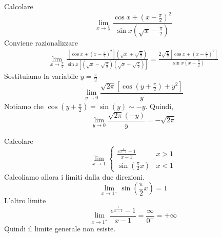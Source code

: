 \documentclass[a4paper]{article}
\begin{document}
\begin{snippetexercise}{}
    Calcolare
    \[
        \lim_{x\to \frac{\pi}{2}}
        \frac{
            \cos x + {\left(x-\frac{\pi}{2}\right)}^2
        }{
            \sin x \left(\sqrt{x} - \frac{\pi}{2}\right)
        }
    \]
    Conviene razionalizzare
    \begin{align*}
        \lim_{x\to \frac{\pi}{2}}
        \frac{
            \left[\cos x + {\left(x-\frac{\pi}{2}\right)}^2\right]
            \left(\sqrt{x} + \sqrt{\frac{\pi}{2}}\right)
        }{
            \sin x \left[
                \left(\sqrt{x} - \sqrt{\frac{\pi}{2}}\right)
                \left(\sqrt{x} + \sqrt{\frac{\pi}{2}}\right)
            \right]
        } = \frac{
            2\sqrt{\frac{\pi}{2}} \left[\cos x + {\left(x - \frac{\pi}{2}\right)}^2\right]
        }{
            \sin x\left(x-\frac{\pi}{2}\right)
        }
    \end{align*}
    Sostituiamo la variabile \(y = \frac{\pi}{2}\)
    \[
        \lim_{y\to 0} \frac{
        \sqrt{2\pi} \left[
            \cos\left(y + \frac{\pi}{2}\right) + y^2
        \right]
        }{y}
    \]
    Notiamo che \(\cos\left(y + \frac{\pi}{2}\right)  = \sin\left(y\right) \sim -y\).
    Quindi,
    \[
        \lim_{y\to 0} \frac{\sqrt{2\pi}(-y)}{y} = -\sqrt{2\pi}
    \]
\end{snippetexercise}

\begin{snippetexercise}{}
    Calcolare
    \[
        \lim_{x\to 1} \begin{cases}
            \frac{e^{\frac{1}{x-1}} - 1}{x-1} & x > 1 \\
            \sin(\frac{\pi}{2} x) & x < 1
        \end{cases}
    \]
    Calcoliamo allora i limiti dalla due direzioni.
    \[
        \lim_{x\to 1^-} \sin(\frac{\pi}{2} x) = 1
    \]
    L'altro limite
    \[
        \lim_{x\to 1^+} \frac{e^{\frac{1}{x-1}} - 1}{x-1}
        = \frac{\infty}{0^+} = +\infty
    \]
    Quindi il limite generale non esiste.
\end{snippetexercise}
\end{document}
